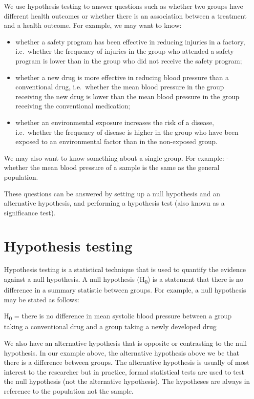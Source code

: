 \documentclass[
]{memoir}
\providecommand{\tightlist}{%
  \setlength{\itemsep}{0pt}\setlength{\parskip}{0pt}}
\begin{document}
We use hypothesis testing to answer questions such as whether two groups have different health outcomes or whether there is an association between a treatment and a health outcome. For example, we may want to know:

\begin{itemize}
\tightlist
\item
  whether a safety program has been effective in reducing injuries in a factory, i.e.~whether the frequency of injuries in the group who attended a safety program is lower than in the group who did not receive the safety program;
\item
  whether a new drug is more effective in reducing blood pressure than a conventional drug, i.e.~whether the mean blood pressure in the group receiving the new drug is lower than the mean blood pressure in the group receiving the conventional medication;
\item
  whether an environmental exposure increases the risk of a disease, i.e.~whether the frequency of disease is higher in the group who have been exposed to an environmental factor than in the non-exposed group.
\end{itemize}

We may also want to know something about a single group. For example:
- whether the mean blood pressure of a sample is the same as the general population.

These questions can be answered by setting up a null hypothesis and an alternative hypothesis, and performing a hypothesis test (also known as a significance test).

\hypertarget{hypothesis-testing-1}{%
\section{Hypothesis testing}\label{hypothesis-testing-1}}

Hypothesis testing is a statistical technique that is used to quantify the evidence against a null hypothesis. A null hypothesis (H\textsubscript{0}) is a statement that there is no difference in a summary statistic between groups. For example, a null hypothesis may be stated as follows:

H\textsubscript{0} = there is no difference in mean systolic blood pressure between a group taking a conventional drug and a group taking a newly developed drug

We also have an alternative hypothesis that is opposite or contrasting to the null hypothesis. In our example above, the alternative hypothesis above we be that there is a difference between groups. The alternative hypothesis is usually of most interest to the researcher but in practice, formal statistical tests are used to test the null hypothesis (not the alternative hypothesis). The hypotheses are always in reference to the population not the sample.
\end{document}
